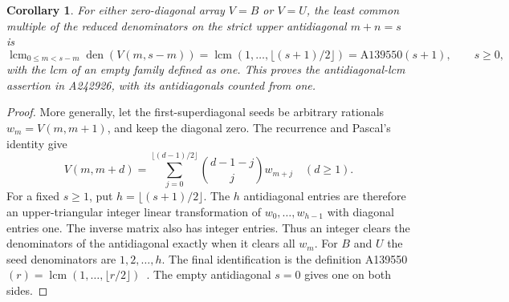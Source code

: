\documentclass[11pt]{article}
\newtheorem{corollary}[theorem]{Corollary}
\begin{document}
\begin{corollary}\label{cor:antidiagonallcm}
For either zero-diagonal array $V=B$ or $V=U$, the least common multiple
of the reduced denominators on the strict upper antidiagonal $m+n=s$ is
\[
 \operatorname{lcm}_{0\le m<s-m}\operatorname{den}(V(m,s-m))
 =\operatorname{lcm}(1,\ldots,\lfloor(s+1)/2\rfloor)
 =\mathrm{A139550}(s+1),\qquad s\ge0,
\]
with the lcm of an empty family defined as one. This proves the
antidiagonal-lcm assertion in A242926, with its antidiagonals counted from one.
\end{corollary}
\begin{proof}
More generally, let the first-superdiagonal seeds be arbitrary rationals
$w_m=V(m,m+1)$, and keep the diagonal zero.
The recurrence and Pascal's identity give
\[
 V(m,m+d)=\sum_{j=0}^{\lfloor(d-1)/2\rfloor}
                  \binom{d-1-j}{j}w_{m+j}\quad(d\ge1).
\]
For a fixed $s\ge1$, put $h=\lfloor(s+1)/2\rfloor$.
The $h$ antidiagonal entries are therefore an upper-triangular integer
linear transformation of $w_0,\ldots,w_{h-1}$ with diagonal entries one.
The inverse matrix also has integer entries. Thus an integer clears the
denominators of the antidiagonal exactly when it clears all $w_m$.
For $B$ and $U$ the seed denominators are $1,2,\ldots,h$.
The final identification is the definition
A139550$(r)=\operatorname{lcm}(1,\ldots,\lfloor r/2\rfloor)$~\cite{antidiagonals}.
The empty antidiagonal $s=0$ gives one on both sides.
\end{proof}
\end{document}
